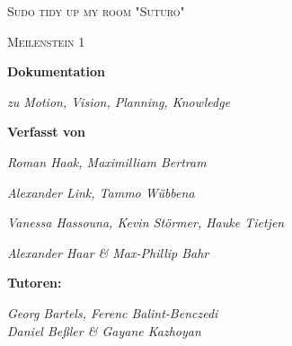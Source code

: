 \documentclass[12pt,a4paper]{report}
\begin{document}
\begin{titlepage}
	\centering
	{\scshape\LARGE Sudo tidy up my room "Suturo" \par}
	\vspace{1.5cm}
	{\scshape\Large Meilenstein 1\par}
	\vspace{1.5cm}
	{\huge\bfseries Dokumentation \par}
	\vspace{2cm}
	{\small\itshape zu Motion, Vision, Planning, Knowledge\par}
	\vspace{2.5cm}
	{\normalsize\bfseries Verfasst von \par}
	{\small\itshape Roman Haak, Maximilliam Bertram\par}
	{\small\itshape Alexander Link, Tammo W\"ubbena\par}
	{\small\itshape Vanessa Hassouna, Kevin St\"ormer, Hauke Tietjen\par}	
	{\small\itshape Alexander Haar \&  Max-Phillip Bahr\par}	
	\vspace{2.5cm}
	{\normalsize\bfseries Tutoren: \par}
	{\small\itshape Georg Bartels, Ferenc Balint-Benczedi \\ Daniel Be{\ss}ler \& Gayane Kazhoyan\par}


	\vfill
\end{titlepage}
\end{document}
